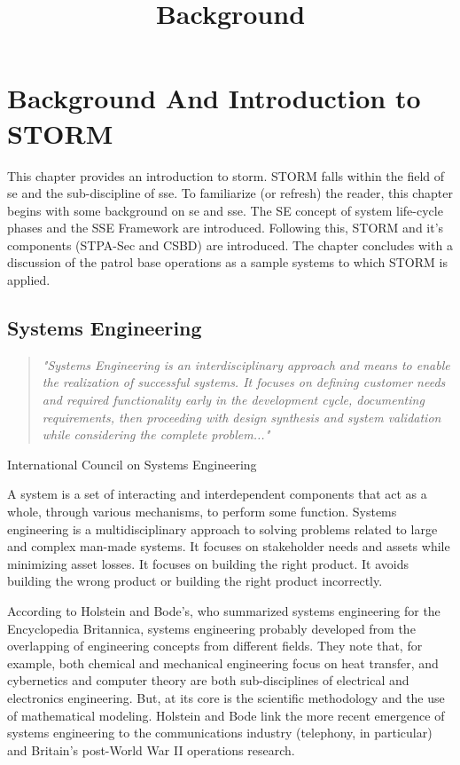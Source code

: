 \documentclass[../../main/main.tex]{subfiles}
\begin{document}
\title{Background}


\chapter{Background And Introduction to STORM}\label{chp:srorm}
This chapter provides an introduction to \Gls{storm}.  STORM falls within the field of \Gls{se} and the sub-discipline of \Gls{sse}. To familiarize (or refresh) the reader, this chapter begins with some background on \Gls{se} and \Gls{sse}.  The SE concept of system life-cycle phases and the SSE Framework are introduced.  Following this, STORM and it's components (STPA-Sec and CSBD) are introduced.  The chapter concludes with a discussion of the patrol base operations as a sample systems to which STORM is applied.

\section{Systems Engineering}\label{sec:stormse}
\begin{quote}
\textit{"Systems Engineering is an interdisciplinary approach and means to enable the realization of successful systems. It focuses on defining customer needs and required functionality early in the development cycle, documenting requirements, then proceeding with design synthesis and system validation while considering the complete problem..."
}\end{quote}
International Council on Systems Engineering 

A system is a set of interacting and interdependent components that act as a whole,  through various mechanisms, to perform some function. Systems engineering is a multidisciplinary approach to solving problems related to large and complex man-made systems.  It focuses on stakeholder needs and assets while minimizing asset losses.  It focuses on building the right product.  It avoids building the wrong product or building the right product incorrectly.  

According to Holstein and Bode's, who summarized systems engineering for the Encyclopedia Britannica, systems engineering probably developed from the overlapping of engineering concepts from different fields. They note that, for example, both chemical and mechanical engineering focus on heat transfer, and cybernetics and computer theory are both sub-disciplines of electrical and electronics engineering.   But, at its core is the scientific methodology and the use of mathematical modeling.  Holstein and Bode link the more recent emergence of systems engineering to the communications industry (telephony, in particular) and Britain's post-World War II operations research.
\end{document}

